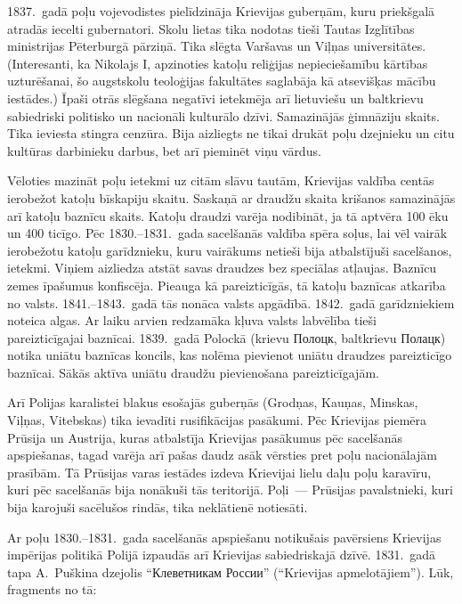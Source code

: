 \documentclass[twoside,a5paper,12pt,fleqn,openany]{extbook}
\newcommand{\rutxti}[1]{\textrussian{#1}}
\begin{document}
1837.~gadā poļu vojevodistes pielīdzināja Krievijas guberņām, kuru priekšgalā atradās iecelti gubernatori. Skolu lietas tika nodotas tieši Tautas Izglītības ministrijas Pēterburgā pārziņā. Tika slēgta Varšavas un Viļņas universitātes. (Interesanti, ka Nikolajs I, apzinoties katoļu reliģijas nepieciešamību kārtības uzturēšanai, šo augstskolu teoloģijas fakultātes saglabāja kā atsevišķas mācību iestādes.) Īpaši otrās slēgšana negatīvi ietekmēja arī lietuviešu un baltkrievu sabiedriski politisko un nacionāli kulturālo dzīvi. Samazinājās ģimnāziju skaits. Tika ieviesta stingra cenzūra. Bija aizliegts ne tikai drukāt poļu dzejnieku un citu kultūras darbinieku darbus, bet arī pieminēt viņu vārdus.

Vēloties mazināt poļu ietekmi uz citām slāvu tautām, Krievijas valdība centās ierobežot katoļu bīskapiju skaitu. Saskaņā ar draudžu skaita krišanos samazinājās arī katoļu baznīcu skaits. Katoļu draudzi varēja nodibināt, ja tā aptvēra 100 ēku un 400 ticīgo. Pēc 1830.--1831.~gada sacelšanās valdība spēra soļus, lai vēl vairāk ierobežotu katoļu garīdznieku, kuru vairākums netieši bija atbalstījuši sacelšanos, ietekmi. Viņiem aizliedza atstāt savas draudzes bez speciālas atļaujas. Baznīcu zemes īpašumus konfiscēja. Pieauga kā pareizticīgās, tā katoļu baznīcas atkarība no valsts. 1841.--1843.~gadā tās nonāca valsts apgādībā. 1842.~gadā garīdzniekiem noteica algas. Ar laiku arvien redzamāka kļuva valsts labvēlība tieši pareizticīgajai baznīcai. 1839.~gadā Polockā (krievu \rutxti{Полоцк}, baltkrievu \rutxti{Полацк}) notika uniātu baznīcas koncils, kas nolēma pievienot uniātu draudzes pareizticīgo baznīcai. Sākās aktīva uniātu draudžu pievienošana pareizticīgajām.

Arī Polijas karalistei blakus esošajās guberņās (Grodņas, Kauņas, Minskas, Viļņas, Vitebskas) tika ievadīti rusifikācijas pasākumi. Pēc Krievijas piemēra Prūsija un Austrija, kuras atbalstīja Krievijas pasākumus pēc sacelšanās apspiešanas, tagad varēja arī pašas daudz asāk vērsties pret poļu nacionālajām prasībām. Tā Prūsijas varas iestādes izdeva Krievijai lielu daļu poļu karavīru, kuri pēc sacelšanās bija nonākuši tās teritorijā. Poļi~--- Prūsijas pavalstnieki, kuri bija karojuši sacēlušos rindās, tika neklātienē notiesāti.

Ar poļu 1830.--1831.~gada sacelšanās apspiešanu notikušais pavērsiens Krievijas impērijas politikā Polijā izpaudās arī Krievijas sabiedriskajā dzīvē. 1831.~gadā tapa A.~Puškina dzejolis ``\rutxti{Клеветникам России}'' (``Krievijas apmelotājiem''). Lūk, fragments no tā:
\end{document}
